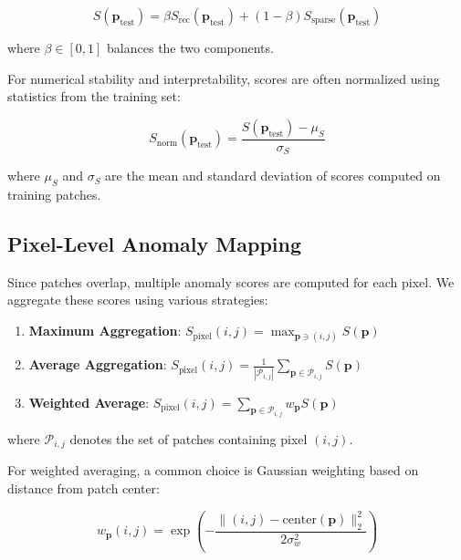 \documentclass[12pt]{article}
\newcommand{\patch}{\mathbf{p}}
\begin{document}
\begin{equation}
    \label{eq:combined_score}
    S(\patch_{\text{test}}) = \beta S_{\text{rec}}(\patch_{\text{test}}) + (1-\beta) S_{\text{sparse}}(\patch_{\text{test}})
\end{equation}

where $\beta \in [0,1]$ balances the two components.

For numerical stability and interpretability, scores are often normalized using statistics from the training set:

\begin{equation}
    \label{eq:normalized_score}
    S_{\text{norm}}(\patch_{\text{test}}) = \frac{S(\patch_{\text{test}}) - \mu_S}{\sigma_S}
\end{equation}

where $\mu_S$ and $\sigma_S$ are the mean and standard deviation of scores computed on training patches.

\subsection{Pixel-Level Anomaly Mapping}
\label{subsec:pixel_mapping}

Since patches overlap, multiple anomaly scores are computed for each pixel. We aggregate these scores using various strategies:

\begin{enumerate}[leftmargin=*]
    \item \textbf{Maximum Aggregation}: $S_{\text{pixel}}(i,j) = \max_{\patch \ni (i,j)} S(\patch)$
    \item \textbf{Average Aggregation}: $S_{\text{pixel}}(i,j) = \frac{1}{|\mathcal{P}_{i,j}|} \sum_{\patch \in \mathcal{P}_{i,j}} S(\patch)$
    \item \textbf{Weighted Average}: $S_{\text{pixel}}(i,j) = \sum_{\patch \in \mathcal{P}_{i,j}} w_{\patch} S(\patch)$
\end{enumerate}

where $\mathcal{P}_{i,j}$ denotes the set of patches containing pixel $(i,j)$.

For weighted averaging, a common choice is Gaussian weighting based on distance from patch center:

\begin{equation}
    \label{eq:gaussian_weights}
    w_{\patch}(i,j) = \exp\left(-\frac{\|(i,j) - \text{center}(\patch)\|_2^2}{2\sigma_w^2}\right)
\end{equation}
\end{document}
